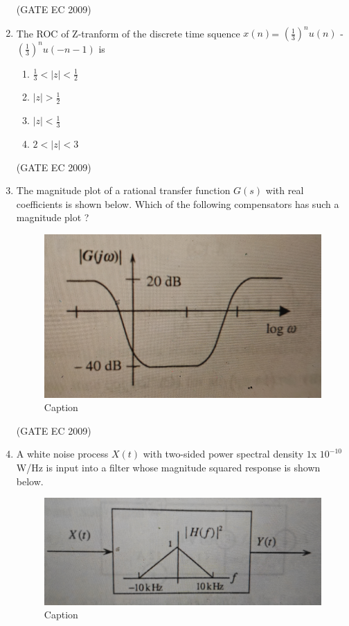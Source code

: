 \documentclass[journal,12pt,onecolumn]{IEEEtran}
\theoremstyle{remark}
\begin{document}
\begin{enumerate}[start=1, label={Q\arabic*.}]
\begin{enumerate}[label=(\Alph*)]
\end{enumerate}
\hfill (GATE EC 2009)

\item The ROC of Z-tranform of the discrete time squence $x(n)$= $(\frac{1}{3})^nu(n)$ - $(\frac{1}{3})^n u(-n-1)$ is 

\begin{enumerate}[label=(\Alph*)]
\item $\frac{1}{3} <|z| <\frac{1}{2}$
\item $|z| >\frac{1}{2}$
\item $|z| <\frac{1}{3}$
\item $2<|z|<3$
\end{enumerate}
\hfill (GATE EC 2009)

\item The magnitude plot of a rational transfer function $G(s)$ with real coefficients is shown below. Which of the following compensators has such a magnitude plot ?

\begin{figure}[H]
    \centering
    \includegraphics[width=0.5\linewidth]{images/img_2.jpg}
    \caption{Caption}
    \label{fig:placeholder}
\end{figure}


\begin{enumerate}[label=(\Alph*)]
\end{enumerate}
\hfill (GATE EC 2009)
\item A white noise process $X(t)$ with two-sided power spectral density $1$x $10^{-10}$ W/Hz is input into a filter whose magnitude squared response is shown below.
\begin{figure}[H]
    \centering
    \includegraphics[width=0.5\linewidth]{images/img_3.jpg}
    \caption{Caption}
    \label{fig:placeholder}
\end{figure}


\end{enumerate}
\end{document}
